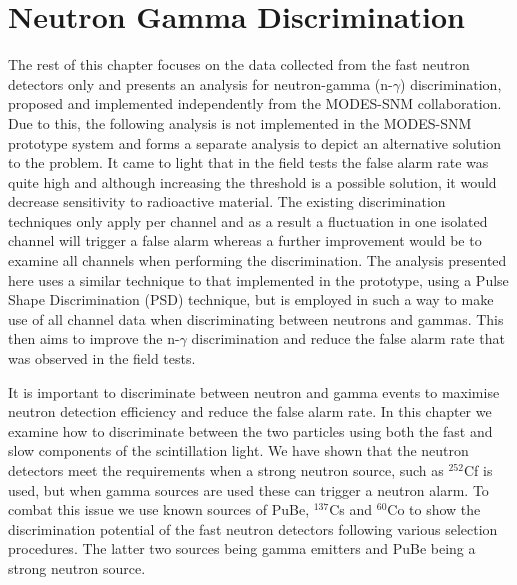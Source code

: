 \section{Neutron Gamma Discrimination}
The rest of this chapter focuses on the data collected from the fast neutron detectors only and presents an analysis for neutron-gamma (n-$\gamma$) discrimination, proposed and implemented independently from the MODES-SNM collaboration. Due to this, the following analysis is not implemented in the MODES-SNM prototype system and forms a separate analysis to depict an alternative solution to the problem. It came to light that in the field tests the false alarm rate was quite high and although increasing the threshold is a possible solution, it would decrease sensitivity to radioactive material. The existing discrimination techniques only apply per channel and as a result a fluctuation in one isolated channel will trigger a false alarm whereas a further improvement would be to examine all channels when performing the discrimination. The analysis presented here uses a similar technique to that implemented in the prototype, using a Pulse Shape Discrimination (PSD) technique, but is employed in such a way to make use of all channel data when discriminating between neutrons and gammas. This then aims to improve the n-$\gamma$ discrimination and reduce the false alarm rate that was observed in the field tests.

It is important to discriminate between neutron and gamma events to maximise neutron detection efficiency and reduce the false alarm rate. In this chapter we examine how to discriminate between the two particles using both the fast and slow components of the scintillation light. We have shown that the neutron detectors meet the requirements when a strong neutron source, such as $^{252}$Cf is used, but when gamma sources are used these can trigger a neutron alarm. To combat this issue we use known sources of PuBe, $^{137}$Cs and $^{60}$Co to show the discrimination potential of the fast neutron detectors following various selection procedures. The latter two sources being gamma emitters and PuBe being a strong neutron source.

